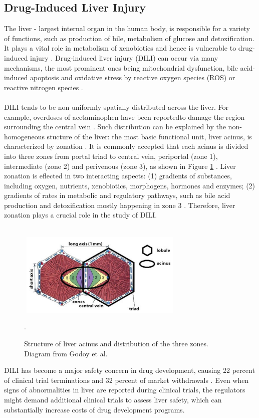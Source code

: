 \documentclass[12pt]{article}
\begin{document}
\subsection{Drug-Induced Liver Injury}
The liver - largest internal organ in the human body, is responsible for a variety of functions, such as production of bile, metabolism of glucose and detoxification. It plays a vital role in metabolism of xenobiotics and hence is vulnerable to drug-induced injury \cite{grantDetoxificationPathwaysLiver}. Drug-induced liver injury (DILI) can occur via many mechanisms, the most prominent ones being mitochondrial dysfunction, bile acid-induced apoptosis and oxidative stress by reactive oxygen species (ROS) or reactive nitrogen species \cite{jaeschkeMechanismsHepatotoxicity2002}.\\\\
DILI tends to be non-uniformly spatially distributed across the liver. For example,  overdoses of acetaminophen have been reportedto damage the region surrounding the central vein \cite{anundiZonationAcetaminophenMetabolism1993a}. Such distribution can be explained by the non-homogeneous stucture of the liver: the most basic functional unit, liver acinus, is characterized by zonation \cite{mancoLiverZonation2021}. It is commonly accepted that each acinus is divided into three zones from portal triad to central vein, periportal (zone 1), intermediate (zone 2) and perivenous (zone 3), as shown in Figure \ref{fig:0} \cite{kietzmannMetabolicZonationLiver2017a,godoyRecentAdvances2D2013}. Liver zonation is eflected in two interacting aspects: (1) gradients of substances, including oxygen, nutrients, xenobiotics, morphogens, hormones and enzymes; (2) gradients of rates in metabolic and regulatory pathways, such as bile acid production and detoxification mostly happening in zone 3 \cite{kietzmannMetabolicZonationLiver2017a}. 
Therefore, liver zonation plays a crucial role in the study of DILI.\\\\
\begin{figure}[h!]
\centering
\includegraphics[width = 8cm, height = 4cm]{acinus.png}
\caption{Structure of liver acinus and distribution of the three zones. Diagram from Godoy et al. \cite{godoyRecentAdvances2D2013}}.
\label{fig:0}
\end{figure}DILI has become a major safety concern in drug development, causing 22 percent of clinical trial terminations and 32 percent of market withdrawals \cite{watkinsDrugSafetySciences2011a}. Even when signs of abnormalities in liver are reported during clinical trials, the regulators might demand additional clinical trials to assess liver safety, which can substantially increase costs of drug development programs.
\end{document}

